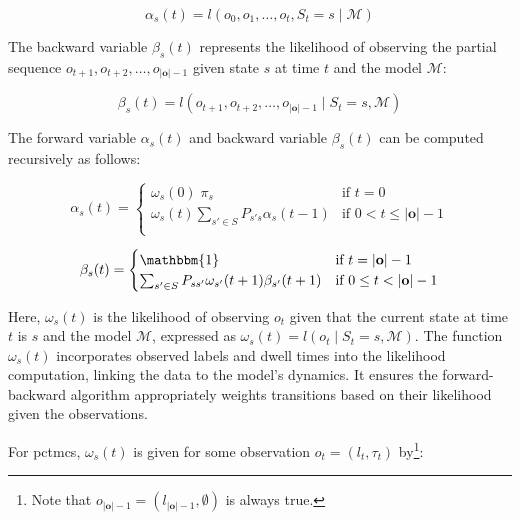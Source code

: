 \begin{equation}
    \alpha_s(t) = l(o_0, o_1, \dots, o_t, S_{t} = s \mid \mathcal{M})
    \label{eq:alpha-recursive}
\end{equation}


The backward variable $\beta_s(t)$ represents the likelihood of observing the partial sequence $o_{t+1}, o_{t+2}, \dots, o_{|\mathbf{o}|-1}$ given state $s$ at time $t$ and the model $\mathcal{M}$:


\begin{equation}
    \beta_s(t) = l(o_{t+1}, o_{t+2}, \dots, o_{|\mathbf{o}|-1} \mid S_{t} = s, \mathcal{M})
    \label{eq:beta-recursive}
\end{equation}


The forward variable $\alpha_s(t)$ and backward variable $\beta_s(t)$ can be computed recursively as follows:


\begin{equation}
    \alpha_s(t) =
    \begin{cases}
        \omega_s(0) \; \pi_s & \text{if } t = 0 \\
        \omega_s(t) \sum_{s' \in S} P_{s's}\alpha_s(t - 1) & \text{if } 0 < t \leq |\mathbf{o}| - 1 \\
    \end{cases}
    \label{eq:forward-recursive}
\end{equation}


\begin{equation}
    \beta_s(t) =
    \begin{cases}
        \mathbbm{1} & \text{if } t = |\mathbf{o}| - 1 \\
        \sum_{s' \in S} P_{ss'} \omega_{s'}(t + 1) \beta_{s'}(t + 1) & \text{if } 0 \leq t < |\mathbf{o}| - 1 \\
    \end{cases}
    \label{eq:backward-recursive}
\end{equation}


Here, $\omega_{s}(t)$ is the likelihood of observing $o_t$ given that the current state at time $t$ is $s$ and the model $\mathcal{M}$, expressed as $\omega_s(t) = l(o_t \mid S_t = s, \mathcal{M})$.
The function $\omega_s(t)$ incorporates observed labels and dwell times into the likelihood computation, linking the data to the model's dynamics.
It ensures the forward-backward algorithm appropriately weights transitions based on their likelihood given the observations.

For \glspl{pctmc}, $\omega_{s}(t)$ is given for some observation $o_t = (l_t, \tau_t)$ by\footnote{Note that $o_{|\mathbf{o}|-1} = (l_{|\mathbf{o}|-1}, \emptyset)$ is always true.}:


